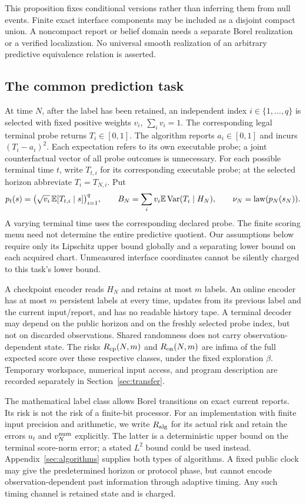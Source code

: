 This proposition fixes conditional versions rather than inferring them from null events. Finite exact interface components may be included as a disjoint compact union. A noncompact report or belief domain needs a separate Borel realization or a verified localization. No universal smooth realization of an arbitrary predictive equivalence relation is asserted.

\subsection{The common prediction task}
At time $N$, after the label has been retained, an independent index $i\in\{1,\ldots,q\}$ is selected with fixed positive weights $v_i$, $\sum_i v_i=1$. The corresponding legal terminal probe returns $T_i\in[0,1]$. The algorithm reports $a_i\in[0,1]$ and incurs $(T_i-a_i)^2$. Each expectation refers to its own executable probe; a joint counterfactual vector of all probe outcomes is unnecessary. For each possible terminal time $t$, write $T_{t,i}$ for its corresponding executable probe; at the selected horizon abbreviate $T_i=T_{N,i}$. Put
\begin{equation}\label{eq:score}
 p_t(s)=\big(\sqrt{v_i}\,\mathbb E[T_{t,i}\mid s]\big)_{i=1}^q,
 \qquad B_N=\sum_i v_i\mathbb E\operatorname{Var}(T_i\mid H_N),
 \qquad \nu_N=\operatorname{law}(p_N(s_N)).
\end{equation}
A varying terminal time uses the corresponding declared probe. The finite scoring menu need not determine the entire predictive quotient. Our assumptions below require only its Lipschitz upper bound globally and a separating lower bound on each acquired chart. Unmeasured interface coordinates cannot be silently charged to this task's lower bound.

A checkpoint encoder reads $H_N$ and retains at most $m$ labels. An online encoder has at most $m$ persistent labels at every time, updates from its previous label and the current input/report, and has no readable history tape. A terminal decoder may depend on the public horizon and on the freshly selected probe index, but not on discarded observations. Shared randomness does not carry observation-dependent state. The risks $R_{\mathrm{cp}}(N,m)$ and $R_{\mathrm{on}}(N,m)$ are infima of the full expected score over these respective classes, under the fixed exploration $\beta$. Temporary workspace, numerical input access, and program description are recorded separately in Section~\ref{sec:transfer}.

The mathematical label class allows Borel transitions on exact current reports. Its risk is not the risk of a finite-bit processor. For an implementation with finite input precision and arithmetic, we write $R_{\rm alg}$ for its actual risk and retain the errors $u_t$ and $v_N^{\rm num}$ explicitly. The latter is a deterministic upper bound on the terminal score-norm error; a stated $L^2$ bound could be used instead. Appendix~\ref{sec:algorithms} supplies both types of algorithms. A fixed public clock may give the predetermined horizon or protocol phase, but cannot encode observation-dependent past information through adaptive timing. Any such timing channel is retained state and is charged.
